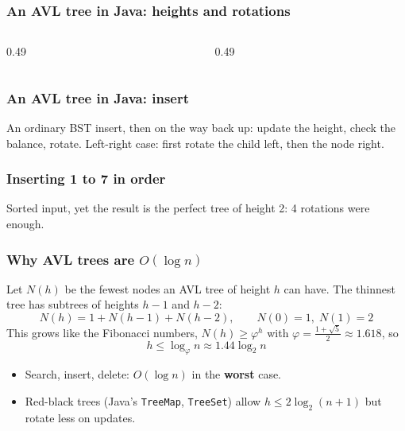 \documentclass[aspectratio=169,10pt,compress]{beamer}
\begin{document}
\begin{frame}[t,fragile] \frametitle{An AVL tree in Java: heights and rotations}
  \begin{columns}[T]
    \begin{column}{0.49\textwidth}
    \end{column}
    \begin{column}{0.49\textwidth}
    \end{column}
  \end{columns}
\end{frame}




\begin{frame}[t,fragile] \frametitle{An AVL tree in Java: insert}
  \small An ordinary BST insert, then on the way back up: update the height, check the balance, rotate.
  Left-right case: first rotate the child left, then the node right.
\end{frame}




\begin{frame}[t,fragile] \frametitle{Inserting 1 to 7 in order}

  \vspace{0.2em}
  \small Sorted input, yet the result is the perfect tree of height 2: 4 rotations were enough.
\end{frame}




\begin{frame}[t,fragile] \frametitle{Why AVL trees are $O(\log n)$}
  Let $N(h)$ be the fewest nodes an AVL tree of height $h$ can have. The thinnest tree has subtrees of heights $h - 1$ and $h - 2$:
  \[
  	N(h) = 1 + N(h-1) + N(h-2), \qquad N(0) = 1, \; N(1) = 2
  \]
  This grows like the Fibonacci numbers, $N(h) \ge \varphi^{h}$ with $\varphi = \frac{1 + \sqrt{5}}{2} \approx 1.618$, so
  \[
  	h \le \log_{\varphi} n \approx 1.44 \log_{2} n
  \]
  \begin{itemize}\small
    \item Search, insert, delete: $O(\log n)$ in the \textbf{worst} case.
    \item Red-black trees (Java's \texttt{TreeMap}, \texttt{TreeSet}) allow $h \le 2 \log_{2}(n + 1)$ but rotate less on updates.
  \end{itemize}
\end{frame}
\end{document}
